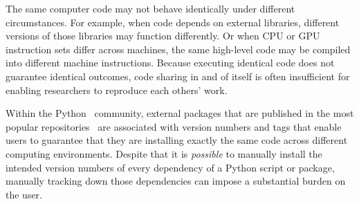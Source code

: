 \documentclass[preprint,12pt,a4paper]{elsarticle}
\begin{document}
The same computer code may not behave identically under different
circumstances.  For example, when code depends on external libraries,
different versions of those libraries may function differently.  Or
when CPU or GPU instruction sets differ across machines, the same
high-level code may be compiled into different machine instructions.
Because executing identical code does not guarantee identical
outcomes, code sharing in and of itself is often insufficient for
enabling researchers to reproduce each others' work.

Within the Python~\citep{vanR95} community, external
packages that are published in the most popular
repositories~\citep{pypi, cond15} are associated with version numbers
and tags that enable users to guarantee that they are installing
exactly the same code across different computing environments.
Despite that it is \textit{possible} to manually install the intended
version numbers of every dependency of a Python script or package, manually
tracking down those dependencies can impose a substantial burden on
the user.
\end{document}
